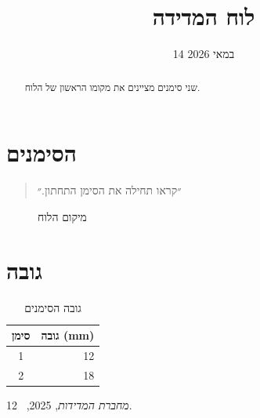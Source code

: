 \documentclass{article}
\begin{document}
\title{לוח המדידה}\author{}\date{14 במאי 2026}\maketitle
\begin{abstract}שני סימנים מציינים את מקומו הראשון של הלוח.\end{abstract}
\tableofcontents
\section{הסימנים}\begin{quote}״קראו תחילה את הסימן התחתון.״\end{quote}
\begin{figure}[ht]\centering\fbox{\rule{0pt}{8mm}\rule{33mm}{0pt}}\caption{מיקום הלוח}\end{figure}
\section{גובה}
\begin{table}[ht]\centering\begin{tabular}{cr}סימן&גובה (mm)\\\hline 1&12\\2&18\end{tabular}\caption{גובה הסימנים}\end{table}
\begin{thebibliography}{1}\emph{מחברת המדידות}, 2025, \chaptername~2.\end{thebibliography}
\end{document}
